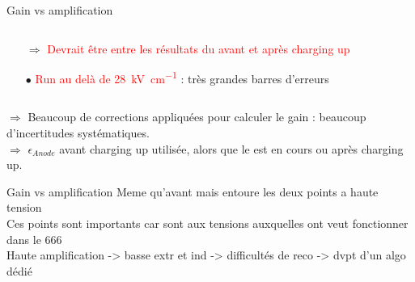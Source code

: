 \begin{frame}{Gain vs amplification}
\begin{scriptsize}
\begin{columns}
\begin{column}{0.5\textwidth}
\begin{itemize}
                        \item[$\Rightarrow$]  \textcolor{red}{Devrait être entre les résultats du \threeL{} avant et après charging up}
                    \end{itemize}
                    \begin{itemize}
                        \item[$\bullet$] \textcolor{red}{Run au delà de \SI{28}{\kilo\volt\per\centi\meter}} : très grandes barres  d'erreurs 
                           \begin{itemize}
                            \end{itemize}
                    \end{itemize}
                \end{column}
            \end{columns}\vspace{0.2cm}
            $\Rightarrow$ Beaucoup de corrections appliquées pour calculer le gain : beaucoup d'incertitudes systématiques.\\
            $\Rightarrow$ $\epsilon_{Anode}$ avant charging up utilisée, alors que le \TOO{} est en cours ou après charging up.
        \end{scriptsize}
    \end{frame}

    \begin{frame}{Gain vs amplification}
        Meme qu'avant mais entoure les deux points a haute tension\\
        Ces points sont importants car sont aux tensions auxquelles ont veut fonctionner dans le 666\\
        Haute amplification -> basse extr et ind -> difficultés de reco -> dvpt d'un algo dédié\\
    \end{frame}

